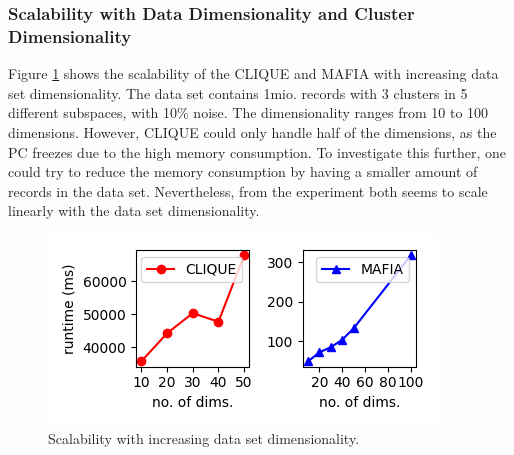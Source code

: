 \subsubsection{Scalability with Data Dimensionality and Cluster Dimensionality}
Figure \ref{fig:data_dimensionality_vs_runtime} shows the scalability of the CLIQUE and MAFIA with increasing data set dimensionality. The data set contains 1mio. records with 3 clusters in 5 different subspaces, with 10\% noise. The dimensionality ranges from 10 to 100 dimensions. However, CLIQUE could only handle half of the dimensions, as the PC freezes due to the high memory consumption. To investigate this further, one could try to reduce the memory consumption by having a smaller amount of records in the data set. Nevertheless, from the experiment both seems to scale linearly with the data set dimensionality.
\begin{figure}[H]
    \vspace*{-0.6cm}
    \centering
    \includegraphics[scale=0.5]{figures/data_dimensionality_vs_runtime.png}
    \caption{Scalability with increasing data set dimensionality.}
    \label{fig:data_dimensionality_vs_runtime}
    \vspace*{-0.6cm}
\end{figure}

